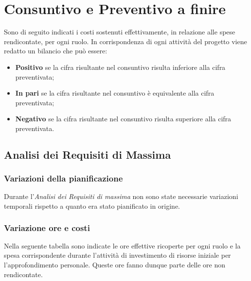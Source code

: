 \appendix
\section{Consuntivo e Preventivo a finire}
Sono di seguito indicati i costi sostenuti effettivamente, in relazione alle spese rendicontate, per ogni ruolo.
In corrispondenza di ogni attività del progetto viene redatto un bilancio che può essere:
\begin{itemize}
	\item \textbf{Positivo} se la cifra risultante nel consuntivo risulta inferiore alla cifra preventivata;
	\item \textbf{In pari} se la cifra risultante nel consuntivo è equivalente alla cifra preventivata;	
	\item \textbf{Negativo} se la cifra risultante nel consuntivo risulta superiore alla cifra preventivata.
\end{itemize}
	\subsection{Analisi dei Requisiti di Massima}
		\subsubsection{Variazioni della pianificazione}
		Durante l'\textit{Analisi dei Requisiti di massima} non sono state necessarie variazioni temporali rispetto a quanto era stato pianificato in origine.
		\subsubsection{Variazione ore e costi}
		Nella seguente tabella sono indicate le ore effettive ricoperte per ogni ruolo e la spesa corrispondente durante l'attività di investimento di risorse iniziale per l'approfondimento personale. Queste ore fanno dunque parte delle ore non rendicontate.
		
